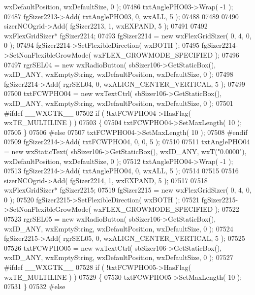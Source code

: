 \begin{DoxyCode}
      wxDefaultPosition, wxDefaultSize, 0 );
07486     txtAnglePHO03->Wrap( -1 );
07487     fgSizer2213->Add( txtAnglePHO03, 0, wxALL, 5 );
07488     
07489     
07490     sizerNCOgrid->Add( fgSizer2213, 1, wxEXPAND, 5 );
07491     
07492     wxFlexGridSizer* fgSizer2214;
07493     fgSizer2214 = \textcolor{keyword}{new} wxFlexGridSizer( 0, 4, 0, 0 );
07494     fgSizer2214->SetFlexibleDirection( wxBOTH );
07495     fgSizer2214->SetNonFlexibleGrowMode( wxFLEX\_GROWMODE\_SPECIFIED );
07496     
07497     rgrSEL04 = \textcolor{keyword}{new} wxRadioButton( sbSizer106->GetStaticBox(), wxID\_ANY, wxEmptyString, wxDefaultPosition, 
      wxDefaultSize, 0 );
07498     fgSizer2214->Add( rgrSEL04, 0, wxALIGN\_CENTER\_VERTICAL, 5 );
07499     
07500     txtFCWPHO04 = \textcolor{keyword}{new} wxTextCtrl( sbSizer106->GetStaticBox(), wxID\_ANY, wxEmptyString, wxDefaultPosition, 
      wxDefaultSize, 0 );
07501 \textcolor{preprocessor}{    #ifdef \_\_WXGTK\_\_}
07502     \textcolor{keywordflow}{if} ( !txtFCWPHO04->HasFlag( wxTE\_MULTILINE ) )
07503     \{
07504     txtFCWPHO04->SetMaxLength( 10 );
07505     \}
07506 \textcolor{preprocessor}{    #else}
07507     txtFCWPHO04->SetMaxLength( 10 );
07508 \textcolor{preprocessor}{    #endif}
07509     fgSizer2214->Add( txtFCWPHO04, 0, 0, 5 );
07510     
07511     txtAnglePHO04 = \textcolor{keyword}{new} wxStaticText( sbSizer106->GetStaticBox(), wxID\_ANY, wxT(\textcolor{stringliteral}{"0.0000"}), 
      wxDefaultPosition, wxDefaultSize, 0 );
07512     txtAnglePHO04->Wrap( -1 );
07513     fgSizer2214->Add( txtAnglePHO04, 0, wxALL, 5 );
07514     
07515     
07516     sizerNCOgrid->Add( fgSizer2214, 1, wxEXPAND, 5 );
07517     
07518     wxFlexGridSizer* fgSizer2215;
07519     fgSizer2215 = \textcolor{keyword}{new} wxFlexGridSizer( 0, 4, 0, 0 );
07520     fgSizer2215->SetFlexibleDirection( wxBOTH );
07521     fgSizer2215->SetNonFlexibleGrowMode( wxFLEX\_GROWMODE\_SPECIFIED );
07522     
07523     rgrSEL05 = \textcolor{keyword}{new} wxRadioButton( sbSizer106->GetStaticBox(), wxID\_ANY, wxEmptyString, wxDefaultPosition, 
      wxDefaultSize, 0 );
07524     fgSizer2215->Add( rgrSEL05, 0, wxALIGN\_CENTER\_VERTICAL, 5 );
07525     
07526     txtFCWPHO05 = \textcolor{keyword}{new} wxTextCtrl( sbSizer106->GetStaticBox(), wxID\_ANY, wxEmptyString, wxDefaultPosition, 
      wxDefaultSize, 0 );
07527 \textcolor{preprocessor}{    #ifdef \_\_WXGTK\_\_}
07528     \textcolor{keywordflow}{if} ( !txtFCWPHO05->HasFlag( wxTE\_MULTILINE ) )
07529     \{
07530     txtFCWPHO05->SetMaxLength( 10 );
07531     \}
07532 \textcolor{preprocessor}{    #else}

\end{DoxyCode}
